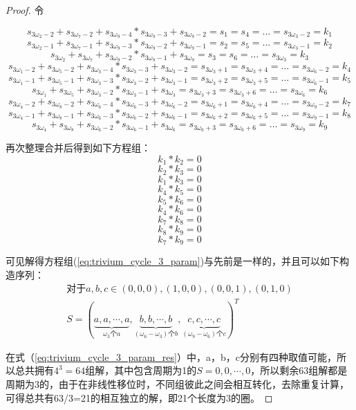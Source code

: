 \begin{thm}
\begin{proof}
令

\[s_{3\omega_{2}-2}+s_{3\omega_{7}-2}+s_{3\omega_{9}-4}*s_{3\omega_{9}-3}+s_{3\omega_{9}-2}=s_{1}=s_{4}=\ldots=s_{3\omega_{3}-2}=k_{1}\]
\[s_{3\omega_{2}-1}+s_{3\omega_{7}-1}+s_{3\omega_{9}-3}*s_{3\omega_{9}-2}+s_{3\omega_{9}-1}=s_{2}=s_{5}=\ldots=s_{3\omega_{3}-1}=k_{2}\]
\[s_{3\omega_{2}}+s_{3\omega_{7}}+s_{3\omega_{9}-2}*s_{3\omega_{9}-1}+s_{3\omega_{9}}=s_{3}=s_{6}=\ldots=s_{3\omega_{3}}=k_{3}\]
\[s_{3\omega_{1}-2}+s_{3\omega_{5}-2}+s_{3\omega_{3}-4}*s_{3\omega_{3}-3}+s_{3\omega_{3}-2}=s_{3\omega_{3}+1}=s_{3\omega_{3}+4}=\ldots=s_{3\omega_{6}-2}=k_{4}\]
\[s_{3\omega_{1}-1}+s_{3\omega_{5}-1}+s_{3\omega_{3}-3}*s_{3\omega_{3}-2}+s_{3\omega_{3}-1}=s_{3\omega_{3}+2}=s_{3\omega_{3}+5}=\ldots=s_{3\omega_{6}-1}=k_{5}\]
\[s_{3\omega_{1}}+s_{3\omega_{5}}+s_{3\omega_{3}-2}*s_{3\omega_{3}-1}+s_{3\omega_{3}}=s_{3\omega_{3}+3}=s_{3\omega_{3}+6}=\ldots=s_{3\omega_{6}}=k_{6}\]
\[s_{3\omega_{4}-2}+s_{3\omega_{8}-2}+s_{3\omega_{6}-4}*s_{3\omega_{6}-3}+s_{3\omega_{6}-2}=s_{3\omega_{6}+1}=s_{3\omega_{6}+4}=\ldots=s_{3\omega_{9}-2}=k_{7}\]
\[s_{3\omega_{4}-1}+s_{3\omega_{8}-1}+s_{3\omega_{6}-3}*s_{3\omega_{6}-2}+s_{3\omega_{6}-1}=s_{3\omega_{6}+2}=s_{3\omega_{6}+5}=\ldots=s_{3\omega_{9}-1}=k_{8}\]
\[s_{3\omega_{4}}+s_{3\omega_{8}}+s_{3\omega_{6}-2}*s_{3\omega_{6}-1}+s_{3\omega_{6}}=s_{3\omega_{6}+3}=s_{3\omega_{6}+6}=\ldots=s_{3\omega_{9}}=k_{9}\]

再次整理合并后得到如下方程组：
\[k_{1}*k_{2}=0\]
\[k_{2}*k_{3}=0\]
\[k_{1}*k_{3}=0\]
\[k_{4}*k_{5}=0\]
\[k_{5}*k_{6}=0\]
\[k_{4}*k_{6}=0\]
\[k_{7}*k_{8}=0\]
\[k_{8}*k_{9}=0\]
\[k_{7}*k_{9}=0\]

\begin{equation}
\label{eq:trivium_cycle_3_param}
\end{equation}
可见解得方程组(\ref{eq:trivium_cycle_3_param})与先前是一样的，并且可以如下构造序列：
\begin{align}
\label{eq:trivium_cycle_3_param_res}
\text{对于}a, b, c \in {(0, 0, 0), (1, 0, 0), (0, 0, 1), (0, 1, 0)}\\
S = (\underbrace{a,a,\cdots,a}_{\omega_{3}\text{个}a},\underbrace{b,b,\cdots,b}_{(\omega_{6}-\omega_{3})\text{个}b},\underbrace{c,c,\cdots,c}_{(\omega_{9}-\omega_{6})\text{个}c})^{T}
\end{align}

在式（\ref{eq:trivium_cycle_3_param_res}）中，a，b，c分别有四种取值可能，所以总共拥有$4^{3}=64$组解，其中包含周期为1的$S={0,0,\cdots,0}$，所以剩余63组解都是周期为3的，由于在非线性移位时，不同组彼此之间会相互转化，去除重复计算，可得总共有63/3=21的相互独立的解，即21个长度为3的圈。

\end{proof}
\end{thm}
